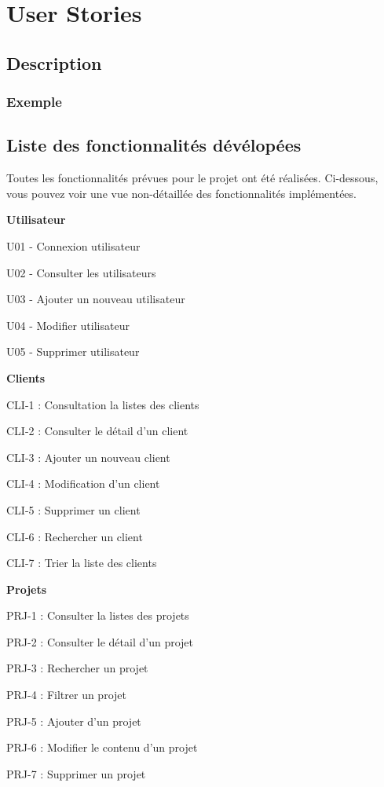 \section{User Stories}
\subsection{Description }
\subsubsection{Exemple }
\subsection{Liste des fonctionnalités dévélopées}
Toutes les fonctionnalités prévues pour le projet ont été réalisées. 
Ci-dessous, vous pouvez voir une vue non-détaillée des fonctionnalités implémentées.

\textbf{Utilisateur}
\begin{todolist}
    \item[\done] U01 - Connexion utilisateur
    \item[\done] U02 - Consulter les utilisateurs
    \item[\done] U03 - Ajouter un nouveau utilisateur
    \item[\done] U04 - Modifier utilisateur
    \item[\done] U05 - Supprimer utilisateur 
\end{todolist}

\textbf{Clients}
\begin{todolist}
    \item[\done] CLI-1 : Consultation la listes des clients
    \item[\done] CLI-2 : Consulter le détail d’un client
    \item[\done] CLI-3 : Ajouter un nouveau client
    \item[\done] CLI-4 : Modification d'un client
    \item[\done] CLI-5 : Supprimer un client
    \item[\done] CLI-6 : Rechercher un client
    \item[\done] CLI-7 : Trier la liste des clients 
\end{todolist}

\textbf{Projets}
\begin{todolist}
    \item[\done] PRJ-1 : Consulter la listes des projets
    \item[\done] PRJ-2 : Consulter le détail d’un projet
    \item[\done] PRJ-3 : Rechercher un projet
    \item[\done] PRJ-4 : Filtrer un projet
    \item[\done] PRJ-5 : Ajouter d’un projet
    \item[\done] PRJ-6 : Modifier le contenu d’un projet
    \item[\done] PRJ-7 : Supprimer un projet

\end{todolist}


